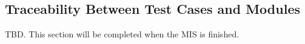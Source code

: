 \documentclass[12pt, titlepage]{article}
\begin{document}
					
					
					
					

					
					
					
					




\subsection{Traceability Between Test Cases and Modules}

TBD. This section will be completed when the MIS is finished.


\newpage




\newpage





\end{document}
